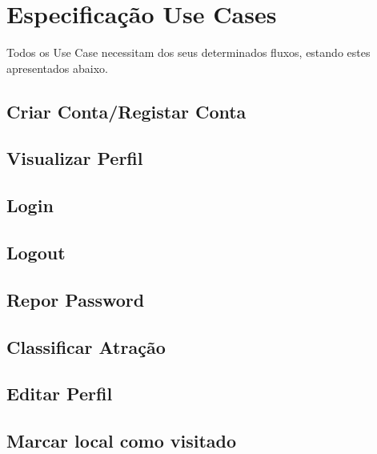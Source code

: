 \documentclass[
  oneside,
  11pt, a4paper,
  footinclude=true,
  headinclude=true,
  cleardoublepage=empty
]{scrbook}
\begin{document}
    \newpage
    
    \section{Especificação Use Cases}
    
    Todos os Use Case necessitam dos seus determinados fluxos, estando estes apresentados abaixo.
    
    \subsection{Criar Conta/Registar Conta}
    
    
    \subsection{Visualizar Perfil}
    
    
    \newpage
    
    \subsection{Login}
    
    
    \subsection{Logout}
    
    
    \subsection{Repor Password}
    
    
    \newpage
    
    
    \subsection{Classificar Atração}
    
    
    \subsection{Editar Perfil}
    
    
    \newpage
    
    
    \subsection{Marcar local como visitado}
    
    
\end{document}
